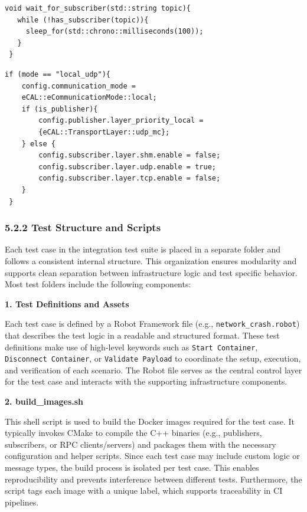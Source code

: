 \begin{lstlisting}[style=cppstyle, caption={Simplified wait\_for\_subscriber logic}, label={lst:wait_for_subscriber}, captionpos=b]
 void wait_for_subscriber(std::string topic){
   while (!has_subscriber(topic)){
     sleep_for(std::chrono::milliseconds(100));
   }
 }
\end{lstlisting}

\vspace{1em}
\begin{lstlisting}[style=cppstyle, caption={Partial example for UDP setup}, label={lst:setup_ecal}, captionpos=b]
 if (mode == "local_udp"){
    config.communication_mode = 
    eCAL::eCommunicationMode::local;
    if (is_publisher){
    	config.publisher.layer_priority_local = 
    	{eCAL::TransportLayer::udp_mc};
    } else {
    	config.subscriber.layer.shm.enable = false;
    	config.subscriber.layer.udp.enable = true;
    	config.subscriber.layer.tcp.enable = false;
    }
 }
\end{lstlisting}

\clearpage
\subsubsection*{5.2.2 Test Structure and Scripts}

Each test case in the integration test suite is placed in a separate folder and follows a consistent internal structure. This organization ensures modularity and supports clean separation between infrastructure logic and test specific behavior. Most test folders include the following components:

\vspace{1em}
\textbf{1. Test Definitions and Assets}

\vspace{0.3em}
Each test case is defined by a Robot Framework file (e.g., \texttt{network\_crash.robot}) that describes the test logic in a readable and structured format. These test definitions make use of high-level keywords such as \texttt{Start Container}, \texttt{Disconnect Container}, or \texttt{Validate Payload} to coordinate the setup, execution, and verification of each scenario. The Robot file serves as the central control layer for the test case and interacts with the supporting infrastructure components.

\vspace{1em}
\textbf{2. build\_images.sh}

\vspace{0.3em}
This shell script is used to build the Docker images required for the test case. It typically invokes CMake to compile the C++ binaries (e.g., publishers, subscribers, or RPC clients/servers) and packages them with the necessary configuration and helper scripts. Since each test case may include custom logic or message types, the build process is isolated per test case. This enables reproducibility and prevents interference between different tests. Furthermore, the script tags each image with a unique label, which supports traceability in CI pipelines.

